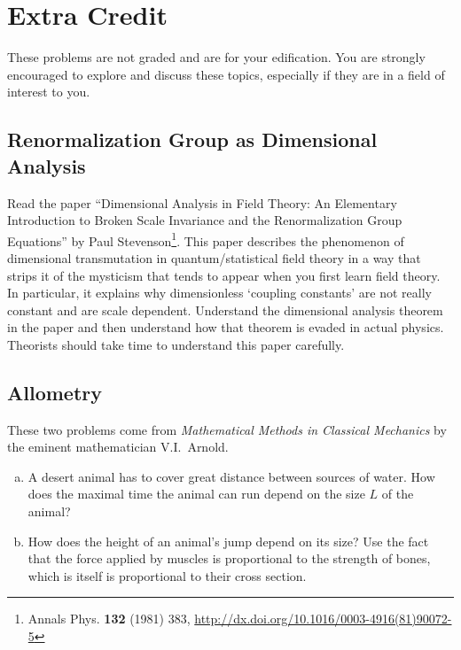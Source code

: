 \documentclass[12pt]{article}
\numberwithin{equation}{section}    %
\begin{document}
\section{Extra Credit}

These problems are not graded and are for your edification. You are strongly encouraged to explore and discuss these topics, especially if they are in a field of interest to you.

\subsection{Renormalization Group as Dimensional Analysis}

Read the paper ``Dimensional Analysis in Field Theory: An Elementary Introduction to Broken Scale Invariance and the Renormalization Group Equations'' by Paul Stevenson\footnote{Annals Phys. \textbf{132} (1981) 383, \url{http://dx.doi.org/10.1016/0003-4916(81)90072-5}}. This paper describes the phenomenon of dimensional transmutation in quantum/statistical field theory in a way that strips it of the mysticism that tends to appear when you first learn field theory. In particular, it explains why dimensionless `coupling constants' are not really constant and are scale dependent. Understand the  dimensional analysis theorem in the paper and then understand how that theorem is evaded in actual physics. Theorists should take time to understand this paper carefully.\


\subsection{Allometry}

These two problems come from \emph{Mathematical Methods in Classical Mechanics} by the eminent mathematician V.I.~Arnold. 

\begin{enumerate}[(a)]

\item A desert animal has to cover great distance between sources of water. How does the maximal time the animal can run depend on the size $L$ of the animal?

\item How does the height of an animal's jump depend on its size? Use the fact that the force applied by muscles is proportional to the strength of bones, which is itself is proportional to their cross section.

\end{enumerate}

%
\end{document}
